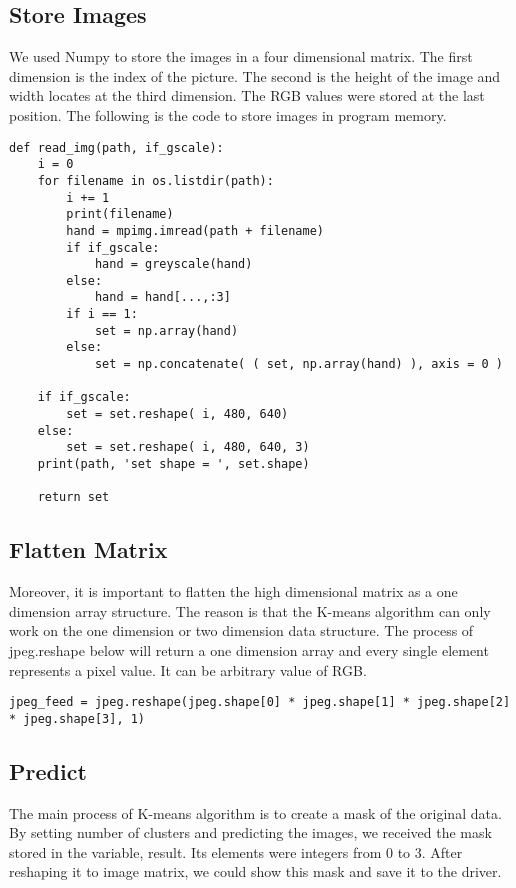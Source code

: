 \documentclass[10pt,journal,compsoc, draftclsnofoot,onecolumn]{IEEEtran}
\begin{document}
\subsection{Store Images}
We used Numpy to store the images in a four dimensional matrix. The first dimension is the index of the picture. The second is the height of the image and width locates at the third dimension. The RGB values were stored at the last position. The following is the code to store images in program memory.

\begin{lstlisting}
def read_img(path, if_gscale):
    i = 0
    for filename in os.listdir(path):
        i += 1
        print(filename)
        hand = mpimg.imread(path + filename)
        if if_gscale:
            hand = greyscale(hand)
        else:
            hand = hand[...,:3]
        if i == 1:
            set = np.array(hand)
        else:  
            set = np.concatenate( ( set, np.array(hand) ), axis = 0 )

    if if_gscale:
        set = set.reshape( i, 480, 640)
    else:
        set = set.reshape( i, 480, 640, 3)
    print(path, 'set shape = ', set.shape)

    return set
\end{lstlisting}

\subsection{Flatten Matrix}
Moreover, it is important to flatten the high dimensional matrix as a one dimension array structure. The reason is that the K-means algorithm can only work on the one dimension or two dimension data structure. The process of jpeg.reshape below will return a one dimension array and every single element represents a pixel value. It can be arbitrary value of RGB. 

\begin{lstlisting}
jpeg_feed = jpeg.reshape(jpeg.shape[0] * jpeg.shape[1] * jpeg.shape[2] * jpeg.shape[3], 1)
\end{lstlisting}

\subsection{Predict}
The main process of K-means algorithm is to create a mask of the original data. By setting number of clusters and predicting the images, we received the mask stored in the variable, result. Its elements were integers from 0 to 3. After reshaping it to image matrix, we could show this mask and save it to the driver. 
\end{document}
